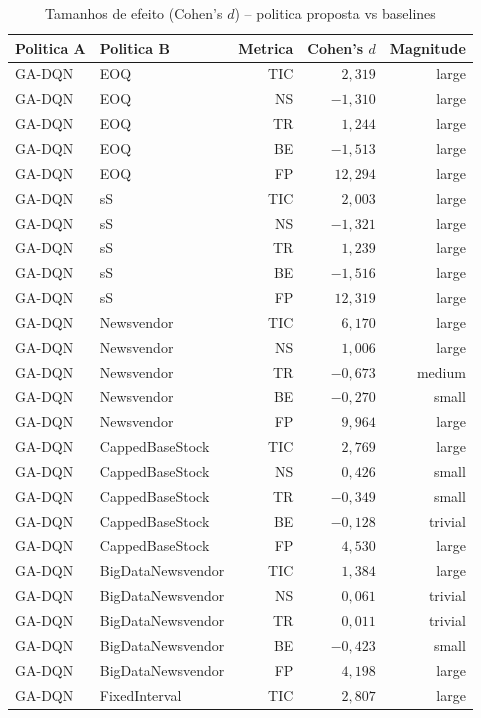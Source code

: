 \begin{table}[htb]
\centering
\caption{Tamanhos de efeito (Cohen's $d$) -- politica proposta vs baselines}
\label{tab:effect_sizes}
\begin{tabular}{llrrr}
\toprule
Politica A & Politica B & Metrica & Cohen's $d$ & Magnitude \\
\midrule
GA-DQN & EOQ & TIC & $2{,}319$ & large \\
GA-DQN & EOQ & NS & $-1{,}310$ & large \\
GA-DQN & EOQ & TR & $1{,}244$ & large \\
GA-DQN & EOQ & BE & $-1{,}513$ & large \\
GA-DQN & EOQ & FP & $12{,}294$ & large \\
GA-DQN & sS & TIC & $2{,}003$ & large \\
GA-DQN & sS & NS & $-1{,}321$ & large \\
GA-DQN & sS & TR & $1{,}239$ & large \\
GA-DQN & sS & BE & $-1{,}516$ & large \\
GA-DQN & sS & FP & $12{,}319$ & large \\
GA-DQN & Newsvendor & TIC & $6{,}170$ & large \\
GA-DQN & Newsvendor & NS & $1{,}006$ & large \\
GA-DQN & Newsvendor & TR & $-0{,}673$ & medium \\
GA-DQN & Newsvendor & BE & $-0{,}270$ & small \\
GA-DQN & Newsvendor & FP & $9{,}964$ & large \\
GA-DQN & CappedBaseStock & TIC & $2{,}769$ & large \\
GA-DQN & CappedBaseStock & NS & $0{,}426$ & small \\
GA-DQN & CappedBaseStock & TR & $-0{,}349$ & small \\
GA-DQN & CappedBaseStock & BE & $-0{,}128$ & trivial \\
GA-DQN & CappedBaseStock & FP & $4{,}530$ & large \\
GA-DQN & BigDataNewsvendor & TIC & $1{,}384$ & large \\
GA-DQN & BigDataNewsvendor & NS & $0{,}061$ & trivial \\
GA-DQN & BigDataNewsvendor & TR & $0{,}011$ & trivial \\
GA-DQN & BigDataNewsvendor & BE & $-0{,}423$ & small \\
GA-DQN & BigDataNewsvendor & FP & $4{,}198$ & large \\
GA-DQN & FixedInterval & TIC & $2{,}807$ & large \\

\end{tabular}
\end{table}
